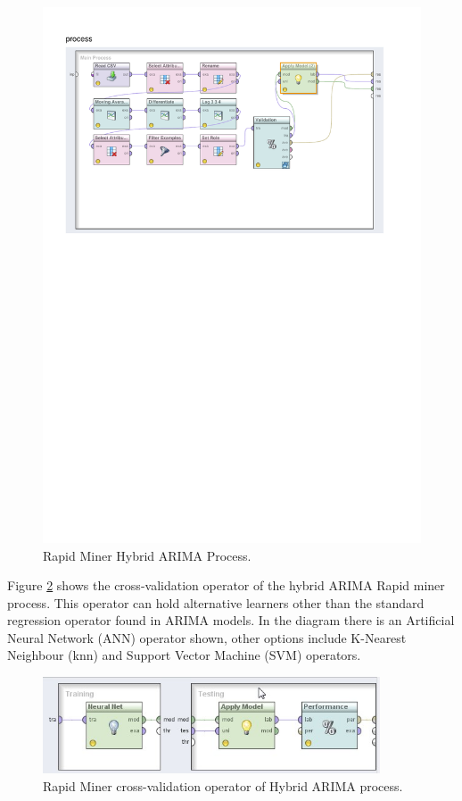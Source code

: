 \begin{figure}[!tbh]
\centering
\includegraphics[width=12cm]{../Figures/chp_ts_rm_arima}
\caption[Rapid Miner Hybrid ARIMA Process]{Rapid Miner Hybrid ARIMA Process.}
\label{fig:chp_ts_rm_arima}
\end{figure}

Figure \ref{fig:chp_ts_rm_arima_validation} shows the cross-validation operator of the hybrid ARIMA Rapid miner process. This operator can hold alternative learners other than the standard regression operator found in ARIMA models. In the diagram there is an Artificial Neural Network (ANN) operator shown, other options include K-Nearest Neighbour (knn) and Support Vector Machine (SVM) operators.

\begin{figure}[h!]
\centering
\includegraphics[width=10cm]{../Figures/chp_ts_rm_arima_validation}
\caption[Rapid Miner cross-validation operator]{Rapid Miner cross-validation operator of Hybrid ARIMA process.}
\label{fig:chp_ts_rm_arima_validation}
\end{figure}

